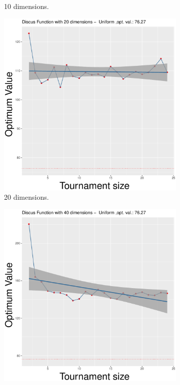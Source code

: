 \begin{figure}[t]
\begin{subfigure}[b]{0.33\textwidth}
		\caption{10 dimensions.}
	\end{subfigure}
	\begin{subfigure}[b]{0.33\textwidth}
		\centering
		\includegraphics[width=\textwidth]{img/uniform-20D/unimodal_uniform_11_dim_20.pdf}
		\caption{20 dimensions.}
	\end{subfigure}
	\begin{subfigure}[b]{0.33\textwidth}
		\centering
		\includegraphics[width=\textwidth]{img/uniform-40D/unimodal_uniform_11_dim_40.pdf}

\end{subfigure}
\end{figure}
